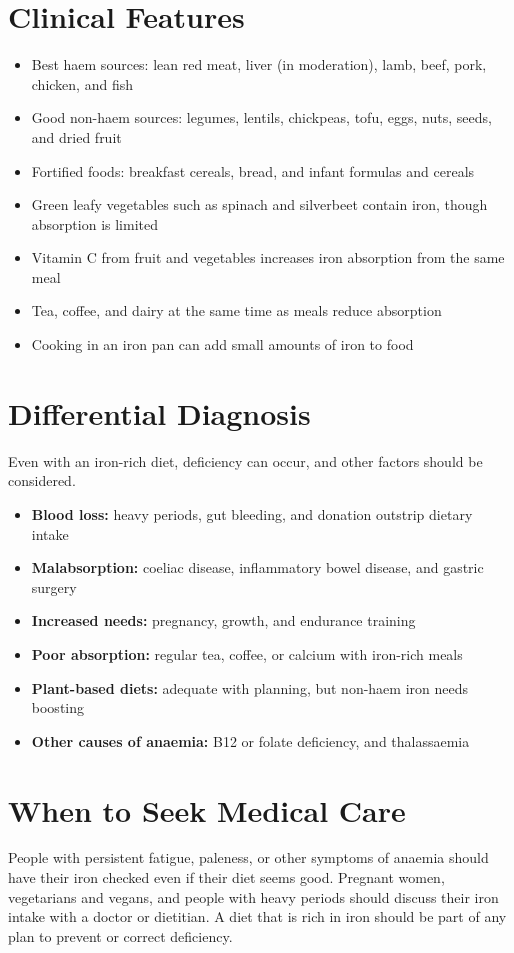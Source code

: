 \section*{Clinical Features}
\begin{itemize}
    \item Best haem sources: lean red meat, liver (in moderation), lamb, beef, pork, chicken, and fish
    \item Good non-haem sources: legumes, lentils, chickpeas, tofu, eggs, nuts, seeds, and dried fruit
    \item Fortified foods: breakfast cereals, bread, and infant formulas and cereals
    \item Green leafy vegetables such as spinach and silverbeet contain iron, though absorption is limited
    \item Vitamin C from fruit and vegetables increases iron absorption from the same meal
    \item Tea, coffee, and dairy at the same time as meals reduce absorption
    \item Cooking in an iron pan can add small amounts of iron to food
\end{itemize}

\section*{Differential Diagnosis}
Even with an iron-rich diet, deficiency can occur, and other factors should be considered.
\begin{itemize}
    \item \textbf{Blood loss:} heavy periods, gut bleeding, and donation outstrip dietary intake
    \item \textbf{Malabsorption:} coeliac disease, inflammatory bowel disease, and gastric surgery
    \item \textbf{Increased needs:} pregnancy, growth, and endurance training
    \item \textbf{Poor absorption:} regular tea, coffee, or calcium with iron-rich meals
    \item \textbf{Plant-based diets:} adequate with planning, but non-haem iron needs boosting
    \item \textbf{Other causes of anaemia:} B12 or folate deficiency, and thalassaemia
\end{itemize}

\section*{When to Seek Medical Care}
People with persistent fatigue, paleness, or other symptoms of anaemia should have their iron checked even if their diet seems good. Pregnant women, vegetarians and vegans, and people with heavy periods should discuss their iron intake with a doctor or dietitian. A diet that is rich in iron should be part of any plan to prevent or correct deficiency.

